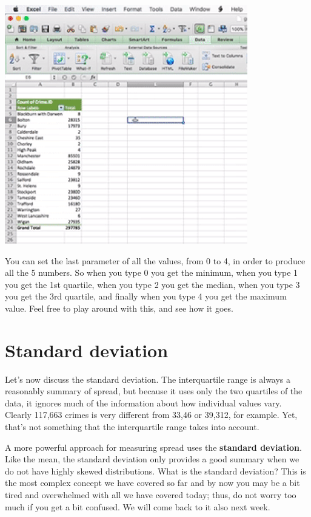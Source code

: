 \documentclass[]{book}
\theoremstyle{definition}
\theoremstyle{definition}
\theoremstyle{definition}
\theoremstyle{remark}
\begin{document}
\includegraphics{imgs/quartile.gif}

You can set the last parameter of all the values, from 0 to 4, in order
to produce all the 5 numbers. So when you type 0 you get the minimum,
when you type 1 you get the 1st quartile, when you type 2 you get the
median, when you type 3 you get the 3rd quartile, and finally when you
type 4 you get the maximum value. Feel free to play around with this,
and see how it goes.

\hypertarget{standard-deviation}{%
\section{Standard deviation}\label{standard-deviation}}

Let's now discuss the standard deviation. The interquartile range is
always a reasonably summary of spread, but because it uses only the two
quartiles of the data, it ignores much of the information about how
individual values vary. Clearly 117,663 crimes is very different from
33,46 or 39,312, for example. Yet, that's not something that the
interquartile range takes into account.

A more powerful approach for measuring spread uses the \textbf{standard
deviation}. Like the mean, the standard deviation only provides a good
summary when we do not have highly skewed distributions. What is the
standard deviation? This is the most complex concept we have covered so
far and by now you may be a bit tired and overwhelmed with all we have
covered today; thus, do not worry too much if you get a bit confused. We
will come back to it also next week.
\end{document}
